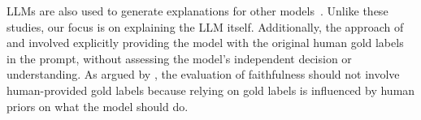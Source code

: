 LLMs are also used to generate explanations for other  models~\cite{bhattacharjee2024towards,slack2023explaining,nguyen2024llms,li2023prompting,gat2023faithful}. Unlike these studies, our focus is on explaining the LLM itself.
Additionally, the approach of \citet{nguyen2024llms} and \citet{li2023prompting} involved explicitly providing the model with the original human gold labels in the prompt, without assessing the model's independent decision or understanding. As argued by \citet{jacovi2020towards}, the evaluation of faithfulness should not involve human-provided gold labels because relying on gold labels is influenced by human priors on what the model should do. 




